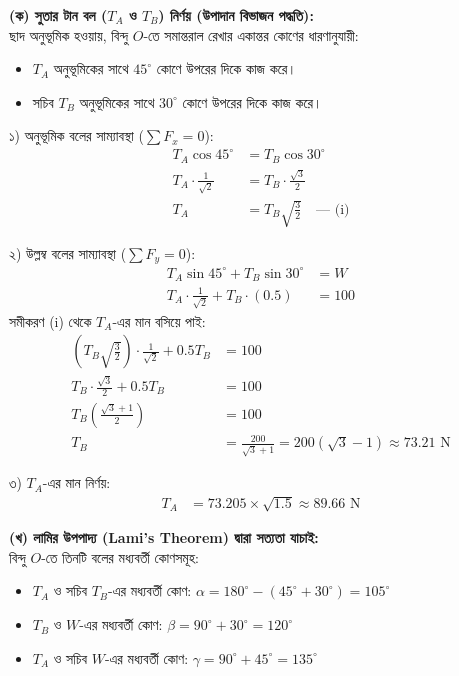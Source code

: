 \documentclass[12pt, a4paper]{article}
\begin{document}
\begin{tcolorbox}[solutionbox={সমাধান (Solution)}]
\noindent
\textbf{(ক) সুতার টান বল ($T_A$ ও $T_B$) নির্ণয় (উপাদান বিভাজন পদ্ধতি):} \\
ছাদ অনুভূমিক হওয়ায়, বিন্দু $O$-তে সমান্তরাল রেখার একান্তর কোণের ধারণানুযায়ী:
\begin{itemize}
    \item $T_A$ অনুভূমিকের সাথে $45^\circ$ কোণে উপরের দিকে কাজ করে।
    \item সচিব $T_B$ অনুভূমিকের সাথে $30^\circ$ কোণে উপরের দিকে কাজ করে।
\end{itemize}

১) অনুভূমিক বলের সাম্যাবস্থা ($\sum F_x = 0$):
\begin{align*}
    T_A \cos 45^\circ &= T_B \cos 30^\circ \\
    T_A \cdot \frac{1}{\sqrt{2}} &= T_B \cdot \frac{\sqrt{3}}{2} \\
    T_A &= T_B \sqrt{\frac{3}{2}} \quad \text{--- (i)}
\end{align*}

২) উল্লম্ব বলের সাম্যাবস্থা ($\sum F_y = 0$):
\begin{align*}
    T_A \sin 45^\circ + T_B \sin 30^\circ &= W \\
    T_A \cdot \frac{1}{\sqrt{2}} + T_B \cdot (0.5) &= 100
\end{align*}
সমীকরণ (i) থেকে $T_A$-এর মান বসিয়ে পাই:
\begin{align*}
    \left(T_B \sqrt{\frac{3}{2}}\right) \cdot \frac{1}{\sqrt{2}} + 0.5 T_B &= 100 \\
    T_B \cdot \frac{\sqrt{3}}{2} + 0.5 T_B &= 100 \\
    T_B \left(\frac{\sqrt{3} + 1}{2}\right) &= 100 \\
    T_B &= \frac{200}{\sqrt{3} + 1} = 200(\sqrt{3} - 1) \approx \mathbf{73.21}\text{ N}
\end{align*}

৩) $T_A$-এর মান নির্ণয়:
\begin{align*}
    T_A &= 73.205 \times \sqrt{1.5} \approx \mathbf{89.66}\text{ N}
\end{align*}

\vspace{0.5em}
\noindent\textbf{(খ) লামির উপপাদ্য (Lami's Theorem) দ্বারা সত্যতা যাচাই:} \\
বিন্দু $O$-তে তিনটি বলের মধ্যবর্তী কোণসমূহ:
\begin{itemize}
    \item $T_A$ ও সচিব $T_B$-এর মধ্যবর্তী কোণ: $\alpha = 180^\circ - (45^\circ + 30^\circ) = 105^\circ$
    \item $T_B$ ও $W$-এর মধ্যবর্তী কোণ: $\beta = 90^\circ + 30^\circ = 120^\circ$
    \item $T_A$ ও সচিব $W$-এর মধ্যবর্তী কোণ: $\gamma = 90^\circ + 45^\circ = 135^\circ$
\end{itemize}


\end{tcolorbox}
\end{document}
